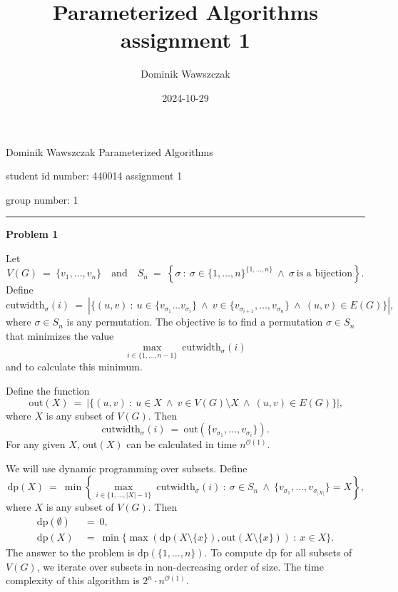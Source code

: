 \documentclass[12pt]{article}
\title{Parameterized Algorithms assignment 1}
\author{Dominik Wawszczak}
\date{2024-10-29}
\begin{document}
	\setlength{\parindent}{0 cm}
	
	Dominik Wawszczak \hfill Parameterized Algorithms
	
	student id number: 440014 \hfill assignment 1
	
	group number: 1
	
	\bigskip
	\hrule
	\bigskip
	
	\textbf{Problem 1}
	
	\medskip
	
	Let
	\[ V(G) \ = \ \{v_{1}, \ldots, v_{n}\} \quad \text{and} \quad S_{n} \ = \
	\left\{ \sigma \ : \ \sigma \in \{1, \ldots, n\}^{\{1, \ldots, n\}} \ \wedge
	\ \sigma \ \text{is a bijection} \right\} \text{.} \]
	Define
	\[ \text{cutwidth}_{\sigma}(i) \ = \ |\{(u, v) \ : \ u \in \{v_{\sigma_{1}}
	\ldots v_{\sigma_{i}}\} \ \wedge \ v \in \{v_{\sigma_{i + 1}}, \ldots,
	v_{\sigma_{n}}\} \ \wedge \ (u, v) \in E(G)\}| \text{,} \]
	where \(\sigma \in S_{n}\) is any permutation. The objective is to find a
	permutation \(\sigma \in S_{n}\) that minimizes the value
	\[ \underset{i \in \{1, \ldots, n - 1\}}{\max} \
	\text{cutwidth}_{\sigma}(i) \]
	and to calculate this minimum.
	
	\medskip
	
	Define the function
	\[ \text{out}(X) \ = \ |\{(u, v) \ : \ u \in X \ \wedge \ v \in V(G)
	\setminus X \ \wedge \ (u, v) \in E(G)\}| \text{,} \]
	where \(X\) is any subset of \(V(G)\). Then
	\[ \text{cutwidth}_{\sigma}(i) \ = \ \text{out}(\{v_{\sigma_{1}}, \ldots,
	v_{\sigma_{i}}\}) \text{.} \]
	For any given \(X\), \(\text{out}(X)\) can be calculated in time
	\(n^{\mathcal{O}(1)}\).
	
	\medskip
	
	We will use dynamic programming over subsets. Define
	\[ \text{dp}(X) \ = \ \min \left\{ \underset{i \in
	\{1, \ldots, |X| - 1\}}{\max} \ \text{cutwidth}_{\sigma}(i) \ : \ \sigma \in
	S_{n} \ \wedge \ \{v_{\sigma_{1}}, \ldots, v_{\sigma_{|X|}}\} = X \right\}
	\text{,} \]
	where \(X\) is any subset of \(V(G)\). Then
	\begin{align*}
		\text{dp}(\emptyset) \ &= \ 0 \text{,} \\
		\text{dp}(X) \ &= \ \min \{\max(\text{dp}(X \setminus \{x\}),
		\text{out}(X \setminus \{x\})) \ : \ x \in X\} \text{.}
	\end{align*}
	The answer to the problem is \(\text{dp}(\{1, \ldots, n\})\). To compute
	\(\text{dp}\) for all subsets of \(V(G)\), we iterate over subsets in
	non-decreasing order of size. The time complexity of this algorithm is
	\(2^{n} \cdot n^{\mathcal{O}(1)}\).
	
\end{document}
